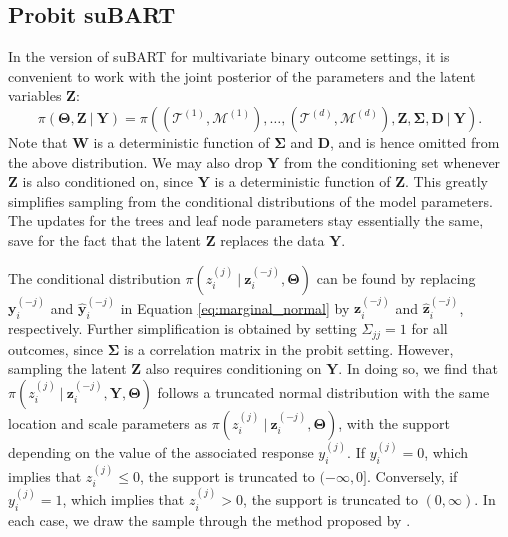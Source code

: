 \documentclass[aoas,preprint]{imsart}
\newcommand\given[1][]{\:#1\vert\:}
\theoremstyle{plain}
\theoremstyle{definition}
\theoremstyle{remark}
\begin{document}
\subsection{Probit suBART}

In the version of suBART for multivariate binary outcome settings, it is convenient to work with the joint posterior of the parameters and the latent variables $\mathbf{Z}$:
\[
\pi\left(\boldsymbol{\Theta},\mathbf{Z}\given \mathbf{Y}\right) = \pi\left(\left(\boldsymbol{\mathcal{T}}^{(1)},\boldsymbol{\mathcal{M}}^{(1)}\right),\ldots,\left(\boldsymbol{\mathcal{T}}^{(d)},\boldsymbol{\mathcal{M}}^{(d)}\right),\mathbf{Z},\boldsymbol{\Sigma},\mathbf{D}\given \mathbf{Y}\right).
\]
Note that $\mathbf{W}$ is a deterministic function of $\boldsymbol{\Sigma}$ and $\mathbf{D}$, and is hence omitted from the above distribution. We may also drop $\mathbf{Y}$ from the conditioning set whenever $\mathbf{Z}$ is also conditioned on, since $\mathbf{Y}$ is a deterministic function of $\mathbf{Z}$. This greatly simplifies sampling from the conditional distributions of the model parameters.
The updates for the trees and leaf node parameters stay essentially the same, save for the fact that the latent $\mathbf{Z}$ replaces the data $\mathbf{Y}$. 

The conditional distribution $\pi(z^{(j)}_i \given \mathbf{z}^{(-j)}_i, \boldsymbol{\Theta})$ can be found by replacing $\mathbf{y}^{(-j)}_i$ and $\hat{\mathbf{y}}^{(-j)}_i$ in Equation \eqref{eq:marginal_normal} by $\mathbf{z}^{(-j)}_i$ and $\hat{\mathbf{z}}^{(-j)}_i$, respectively. Further simplification is obtained by setting $\Sigma_{jj}=1$ for all outcomes,  since $\boldsymbol{\Sigma}$ is a correlation matrix in the probit setting.
However, sampling the latent $\mathbf{Z}$ also requires conditioning on $\mathbf{Y}$. In doing so, we find that $\pi(z^{(j)}_i \given \mathbf{z}^{(-j)}_i, \mathbf{Y}, \boldsymbol{\Theta})$ follows a truncated normal distribution with the same location and scale parameters as $\pi(z^{(j)}_i \given \mathbf{z}^{(-j)}_i, \boldsymbol{\Theta})$, with the support depending on the value of the associated response $y^{(j)}_i$. If $y_i^{(j)}=0$, which implies that $z_i^{(j)} \le 0$, the support is truncated to $(-\infty, 0\rbrack$. Conversely, if $y_i^{(j)}=1$, which implies that $z_i^{(j)} > 0$, the support is truncated to $(0, \infty)$. In each case, we draw the sample through the method proposed by \citet{robert1995simulation}.
\end{document}
